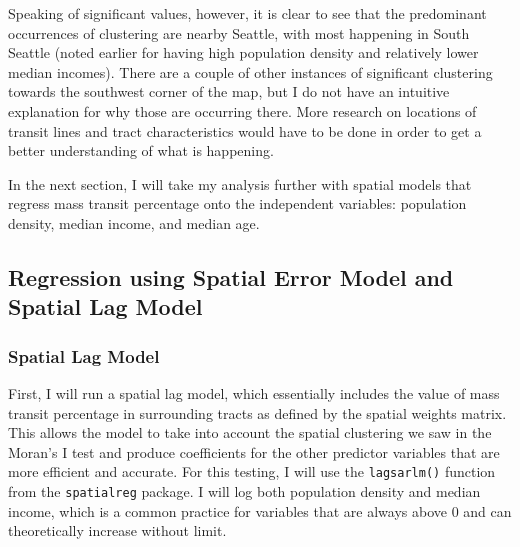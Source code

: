 \documentclass[
]{article}
\begin{document}
Speaking of significant values, however, it is clear to see that the
predominant occurrences of clustering are nearby Seattle, with most
happening in South Seattle (noted earlier for having high population
density and relatively lower median incomes). There are a couple of
other instances of significant clustering towards the southwest corner
of the map, but I do not have an intuitive explanation for why those are
occurring there. More research on locations of transit lines and tract
characteristics would have to be done in order to get a better
understanding of what is happening.

In the next section, I will take my analysis further with spatial models
that regress mass transit percentage onto the independent variables:
population density, median income, and median age.

\subsection{Regression using Spatial Error Model and Spatial Lag
Model}\label{regression-using-spatial-error-model-and-spatial-lag-model}

\subsubsection{Spatial Lag Model}\label{spatial-lag-model}

First, I will run a spatial lag model, which essentially includes the
value of mass transit percentage in surrounding tracts as defined by the
spatial weights matrix. This allows the model to take into account the
spatial clustering we saw in the Moran's I test and produce coefficients
for the other predictor variables that are more efficient and accurate.
For this testing, I will use the \texttt{lagsarlm()} function from the
\texttt{spatialreg} package. I will log both population density and
median income, which is a common practice for variables that are always
above 0 and can theoretically increase without limit.
\end{document}
